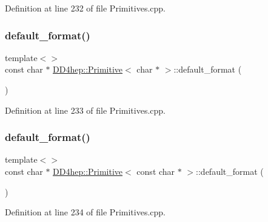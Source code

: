 Definition at line 232 of file Primitives.\+cpp.

\hypertarget{struct_d_d4hep_1_1_primitive_a1d057ef3ff7d931da8b8fa913f7ba177}{}\label{struct_d_d4hep_1_1_primitive_a1d057ef3ff7d931da8b8fa913f7ba177} 
\subsubsection{\texorpdfstring{default\+\_\+format()}{default\_format()}\hspace{0.1cm}{\footnotesize\ttfamily [13/15]}}
{\footnotesize\ttfamily template$<$$>$ \\
const char $\ast$ \hyperlink{struct_d_d4hep_1_1_primitive}{D\+D4hep\+::\+Primitive}$<$ char $\ast$ $>$\+::default\+\_\+format (\begin{DoxyParamCaption}{ }\end{DoxyParamCaption})}



Definition at line 233 of file Primitives.\+cpp.

\hypertarget{struct_d_d4hep_1_1_primitive_a36fcfad49a2a8ffaafad5c8daf0b4899}{}\label{struct_d_d4hep_1_1_primitive_a36fcfad49a2a8ffaafad5c8daf0b4899} 
\subsubsection{\texorpdfstring{default\+\_\+format()}{default\_format()}\hspace{0.1cm}{\footnotesize\ttfamily [14/15]}}
{\footnotesize\ttfamily template$<$$>$ \\
const char $\ast$ \hyperlink{struct_d_d4hep_1_1_primitive}{D\+D4hep\+::\+Primitive}$<$ const char $\ast$ $>$\+::default\+\_\+format (\begin{DoxyParamCaption}{ }\end{DoxyParamCaption})}



Definition at line 234 of file Primitives.\+cpp.

\hypertarget{struct_d_d4hep_1_1_primitive_a9687d0223309623545e48ca3f7d72da3}{}\label{struct_d_d4hep_1_1_primitive_a9687d0223309623545e48ca3f7d72da3} 
